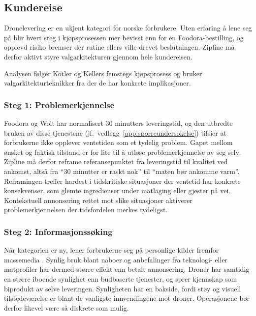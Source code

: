 \subsection{Kundereise}

Dronelevering er en ukjent kategori for norske forbrukere. Uten
erfaring å lene seg på blir hvert steg i kjøpsprosessen mer bevisst enn for
en Foodora-bestilling, og opplevd risiko bremser der rutine ellers ville
drevet beslutningen. Zipline må derfor aktivt styre valgarkitekturen gjennom
hele kundereisen.

Analysen følger Kotler og Kellers femstegs kjøpsprosess
\parencite{kotlerkeller2016} og bruker valgarkitekturteknikker fra
\textcite{muenscher2016} der de har konkrete implikasjoner.

\subsubsection{Steg 1: Problemerkjennelse}

Foodora og Wolt har normalisert 30 minutters leveringstid, og den utbredte
bruken av disse tjenestene (jf.\ vedlegg~\ref{app:sporreundersokelse})
tilsier at forbrukerne ikke opplever ventetiden som et tydelig problem. Gapet mellom ønsket og
faktisk tilstand er for lite til å
utløse problemerkjennelse av seg selv. Zipline må derfor reframe
referansepunktet fra leveringstid til kvalitet ved ankomst, altså fra ``30
minutter er raskt nok'' til ``maten bør ankomme varm''. Reframingen treffer
hardest i tidskritiske situasjoner der ventetid har konkrete konsekvenser,
som glemte ingredienser under matlaging eller gjester på vei. Kontekstuell
annonsering rettet mot slike situasjoner aktiverer problemerkjennelsen der
tidsfordelen merkes tydeligst.

\subsubsection{Steg 2: Informasjonssøking}

Når kategorien er ny, lener forbrukerne seg på personlige kilder fremfor
massemedia \parencite{rogers2003}. Synlig bruk blant naboer og anbefalinger
fra teknologi- eller matprofiler har dermed større effekt enn betalt
annonsering. Droner har samtidig en større iboende synlighet enn budbaserte
tjenester, og sprer kjennskap som biprodukt av selve leveringen.
Synligheten har en bakside, fordi støy og visuell tilstedeværelse er blant
de vanligste innvendingene mot droner. Operasjonene bør derfor likevel være så
diskrete som mulig.

